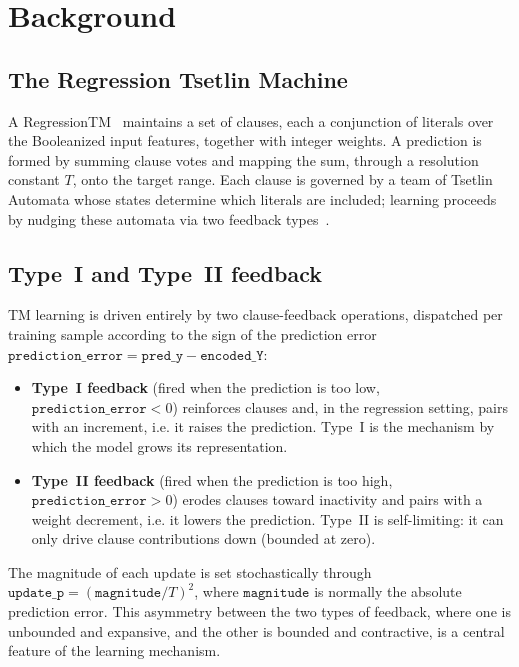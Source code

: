 \section{Background}
\label{sec:background}

\subsection{The Regression Tsetlin Machine}

A RegressionTM~\cite{abeyrathna2020regression} maintains a set of clauses, each a
conjunction of literals over the Booleanized input features, together with integer
weights. A prediction is formed by summing clause votes and mapping the sum, through a
resolution constant $T$, onto the target range. Each clause is governed by a team of
Tsetlin Automata whose states determine which literals are included; learning proceeds by
nudging these automata via two feedback types~\cite{granmo2019convtm}.

\subsection{Type~I and Type~II feedback}
\label{sec:feedback}

TM learning is driven entirely by two clause-feedback operations, dispatched per training
sample according to the sign of the prediction error
$\texttt{prediction\_error} = \texttt{pred\_y} - \texttt{encoded\_Y}$:

\begin{itemize}
  \item \textbf{Type~I feedback} (fired when the prediction is too low,
    $\texttt{prediction\_error} < 0$) reinforces clauses and, in the regression setting,
    pairs with an increment, i.e. it raises the prediction. Type~I is the mechanism by which the model grows its representation.
  \item \textbf{Type~II feedback} (fired when the prediction is too high,
    $\texttt{prediction\_error} > 0$) erodes clauses toward inactivity and pairs with a
    weight decrement, i.e. it lowers the prediction. Type~II is self-limiting: it can only
    drive clause contributions down (bounded at zero).
\end{itemize}

The magnitude of each update is set stochastically through
$\texttt{update\_p} = (\texttt{magnitude}/T)^2$, where $\texttt{magnitude}$ is normally
the absolute prediction error. This asymmetry between the two types of feedback, where one is 
unbounded and expansive, and the other is bounded and contractive, is a central feature of the learning mechanism.
